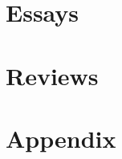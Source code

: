 \documentclass[
]{scrbook}
\begin{document}
\sloppy                         %



\tableofcontents  
\thispagestyle{empty}

% 
\part{Essays}
   

\part{Reviews}

\appendix
\part{Appendix}


\end{document}
